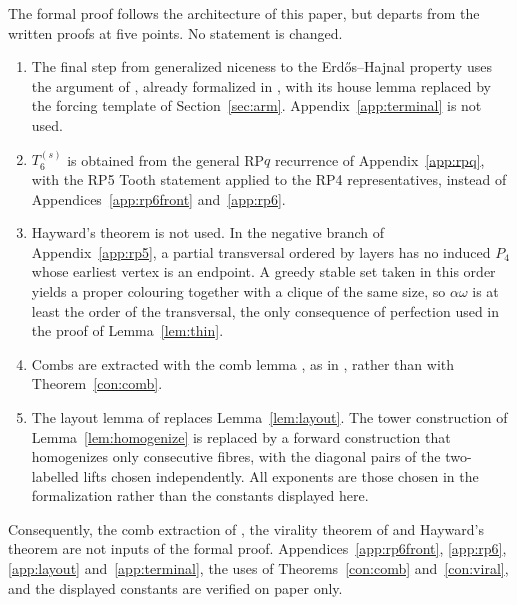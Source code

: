 \documentclass[11pt,a4paper]{article}
\theoremstyle{definition}
\theoremstyle{remark}
\numberwithin{equation}{section}
\begin{document}
The formal proof follows the architecture of this paper, but departs from the written proofs at five points. No statement is changed.
\begin{enumerate}[label=(\roman*)]
\item The final step from generalized niceness to the Erd\H{o}s--Hajnal property uses the argument of \cite{nss7}, already formalized in \cite{p6}, with its house lemma replaced by the forcing template of Section~\ref{sec:arm}. Appendix~\ref{app:terminal} is not used.
\item \(T_6^{(s)}\) is obtained from the general RP\(q\) recurrence of Appendix~\ref{app:rpq}, with the RP5 Tooth statement applied to the RP4 representatives, instead of Appendices~\ref{app:rp6front} and~\ref{app:rp6}.
\item Hayward's theorem is not used. In the negative branch of Appendix~\ref{app:rp5}, a partial transversal ordered by layers has no induced \(P_4\) whose earliest vertex is an endpoint. A greedy stable set taken in this order yields a proper colouring together with a clique of the same size, so \(\alpha\omega\) is at least the order of the transversal, the only consequence of perfection used in the proof of Lemma~\ref{lem:thin}.
\item Combs are extracted with the comb lemma \cite[Lemma~4.3]{nss7}, as in \cite{p6}, rather than with Theorem~\ref{con:comb}.
\item The layout lemma of \cite{p6} replaces Lemma~\ref{lem:layout}. The tower construction of Lemma~\ref{lem:homogenize} is replaced by a forward construction that homogenizes only consecutive fibres, with the diagonal pairs of the two-labelled lifts chosen independently. All exponents are those chosen in the formalization rather than the constants displayed here.
\end{enumerate}
Consequently, the comb extraction of \cite{hjz}, the virality theorem of \cite{bfp} and Hayward's theorem \cite{hayward} are not inputs of the formal proof. Appendices~\ref{app:rp6front}, \ref{app:rp6}, \ref{app:layout} and~\ref{app:terminal}, the uses of Theorems~\ref{con:comb} and~\ref{con:viral}, and the displayed constants are verified on paper only.
\end{document}
